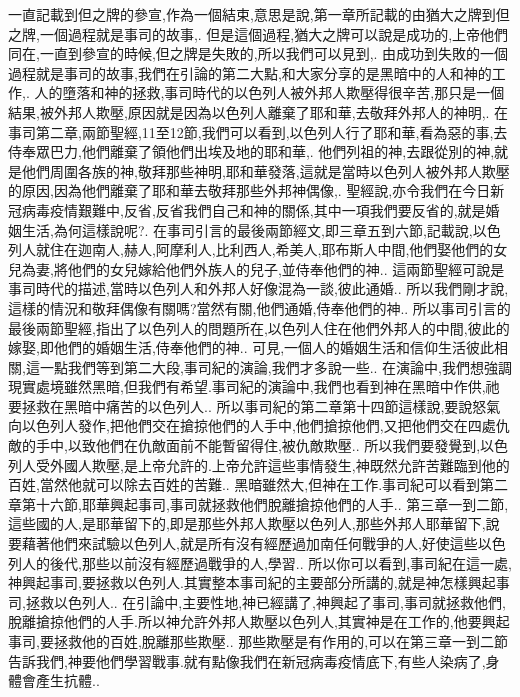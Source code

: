\documentclass{book}
\begin{document}
一直記載到但之牌的參宣,作為一個結束,意思是說,第一章所記載的由猶大之牌到但之牌,一個過程就是事司的故事,.
但是這個過程,猶大之牌可以說是成功的,上帝他們同在,一直到參宣的時候,但之牌是失敗的,所以我們可以見到,.
由成功到失敗的一個過程就是事司的故事,我們在引論的第二大點,和大家分享的是黑暗中的人和神的工作,.
人的墮落和神的拯救,事司時代的以色列人被外邦人欺壓得很辛苦,那只是一個結果,被外邦人欺壓,原因就是因為以色列人離棄了耶和華,去敬拜外邦人的神明,.
在事司第二章,兩節聖經,11至12節,我們可以看到,以色列人行了耶和華,看為惡的事,去侍奉眾巴力,他們離棄了領他們出埃及地的耶和華,.
他們列祖的神,去跟從別的神,就是他們周圍各族的神,敬拜那些神明,耶和華發落,這就是當時以色列人被外邦人欺壓的原因,因為他們離棄了耶和華去敬拜那些外邦神偶像,.
聖經說,亦令我們在今日新冠病毒疫情艱難中,反省,反省我們自己和神的關係,其中一項我們要反省的,就是婚姻生活,為何這樣說呢?.
在事司引言的最後兩節經文,即三章五到六節,記載說,以色列人就住在迦南人,赫人,阿摩利人,比利西人,希美人,耶布斯人中間,他們娶他們的女兒為妻,將他們的女兒嫁給他們外族人的兒子,並侍奉他們的神..
這兩節聖經可說是事司時代的描述,當時以色列人和外邦人好像混為一談,彼此通婚..
所以我們剛才說,這樣的情況和敬拜偶像有關嗎?當然有關,他們通婚,侍奉他們的神..
所以事司引言的最後兩節聖經,指出了以色列人的問題所在,以色列人住在他們外邦人的中間,彼此的嫁娶,即他們的婚姻生活,侍奉他們的神..
可見,一個人的婚姻生活和信仰生活彼此相關,這一點我們等到第二大段,事司紀的演論,我們才多說一些..
在演論中,我們想強調現實處境雖然黑暗,但我們有希望.事司紀的演論中,我們也看到神在黑暗中作供,祂要拯救在黑暗中痛苦的以色列人..
所以事司紀的第二章第十四節這樣說,要說怒氣向以色列人發作,把他們交在搶掠他們的人手中,他們搶掠他們,又把他們交在四處仇敵的手中,以致他們在仇敵面前不能暫留得住,被仇敵欺壓..
所以我們要發覺到,以色列人受外國人欺壓,是上帝允許的.上帝允許這些事情發生,神既然允許苦難臨到他的百姓,當然他就可以除去百姓的苦難..
黑暗雖然大,但神在工作.事司紀可以看到第二章第十六節,耶華興起事司,事司就拯救他們脫離搶掠他們的人手..
第三章一到二節,這些國的人,是耶華留下的,即是那些外邦人欺壓以色列人,那些外邦人耶華留下,說要藉著他們來試驗以色列人,就是所有沒有經歷過加南任何戰爭的人,好使這些以色列人的後代,那些以前沒有經歷過戰爭的人,學習..
所以你可以看到,事司紀在這一處,神興起事司,要拯救以色列人.其實整本事司紀的主要部分所講的,就是神怎樣興起事司,拯救以色列人..
在引論中,主要性地,神已經講了,神興起了事司,事司就拯救他們,脫離搶掠他們的人手.所以神允許外邦人欺壓以色列人,其實神是在工作的,他要興起事司,要拯救他的百姓,脫離那些欺壓..
那些欺壓是有作用的,可以在第三章一到二節告訴我們,神要他們學習戰事.就有點像我們在新冠病毒疫情底下,有些人染病了,身體會產生抗體..
\end{document}
